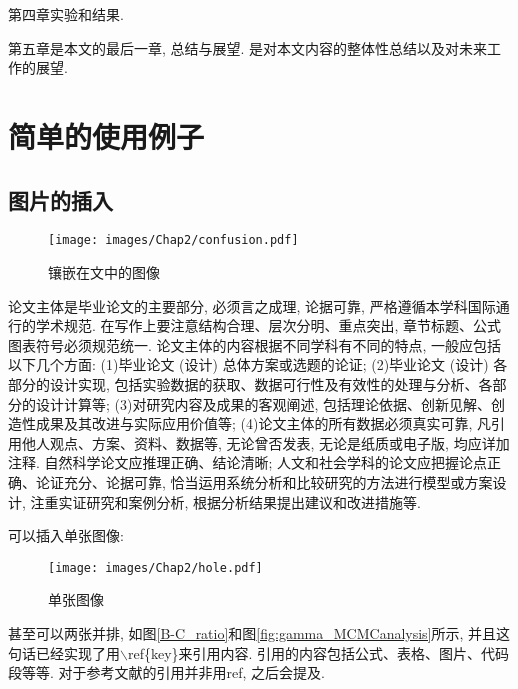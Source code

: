 \documentclass{scutbthesis}
\begin{document}
第四章实验和结果.

第五章是本文的最后一章, 总结与展望. 是对本文内容的整体性总结以及对未来工作的展望.

\pagebreak[4]

\section{简单的使用例子}
\label{cha:example}
\subsection{图片的插入}
\label{sec:Images}
\begin{wrapfigure}{r}{0.5\linewidth}
\centering
\texttt{[image: images/Chap2/confusion.pdf]} %
\caption{镶嵌在文中的图像}
\label{fig:confusion}
\end{wrapfigure}
论文主体是毕业论文的主要部分, 必须言之成理, 论据可靠, 严格遵循本学科国际通行的学术规范. 在写作上要注意结构合理、层次分明、重点突出, 章节标题、公式图表符号必须规范统一. 论文主体的内容根据不同学科有不同的特点, 一般应包括以下几个方面: (1)毕业论文 (设计) 总体方案或选题的论证; (2)毕业论文 (设计) 各部分的设计实现, 包括实验数据的获取、数据可行性及有效性的处理与分析、各部分的设计计算等; (3)对研究内容及成果的客观阐述, 包括理论依据、创新见解、创造性成果及其改进与实际应用价值等; (4)论文主体的所有数据必须真实可靠, 凡引用他人观点、方案、资料、数据等, 无论曾否发表, 无论是纸质或电子版, 均应详加注释. 自然科学论文应推理正确、结论清晰; 人文和社会学科的论文应把握论点正确、论证充分、论据可靠, 恰当运用系统分析和比较研究的方法进行模型或方案设计, 注重实证研究和案例分析, 根据分析结果提出建议和改进措施等.

可以插入单张图像:
\begin{figure}[h]
\centering
\texttt{[image: images/Chap2/hole.pdf]}
\caption{单张图像}
\label{fig:hole}
\end{figure}

甚至可以两张并排, 如图\ref{B-C_ratio}和图\ref{fig:gamma_MCMCanalysis}所示, 并且这句话已经实现了用$\backslash$ref\{key\}来引用内容. 引用的内容包括公式、表格、图片、代码段等等. 对于参考文献的引用并非用ref, 之后会提及.
\end{document}
